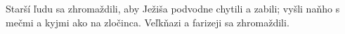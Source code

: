 Starší ľudu sa zhromaždili,
\versseparator
aby Ježiša podvodne chytili a zabili; vyšli naňho s mečmi a kyjmi ako na zločinca.
\versseparator
Veľkňazi a farizeji sa zhromaždili.